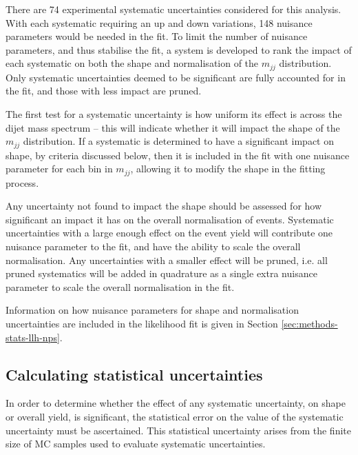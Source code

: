 
There are 74 experimental systematic uncertainties considered for this analysis.
With each systematic requiring an up and down variations, 148 nuisance
parameters would be needed in the fit. To limit the number of nuisance
parameters, and thus stabilise the fit, a system is developed to rank the impact of
each systematic on both the shape and normalisation of the $m_{jj}$
distribution. Only systematic uncertainties deemed to be significant are fully
accounted for in the fit, and those with less impact are pruned.

The first test for a systematic uncertainty is how uniform its effect is across
the dijet mass spectrum -- this will indicate whether it will impact the shape
of the $m_{jj}$ distribution. If a systematic is determined to have a
significant impact on shape, by criteria discussed below, then it is included in
the fit with one nuisance parameter for each bin in $m_{jj}$, allowing it to
modify the shape in the fitting process.

Any uncertainty not found to impact the shape should be assessed for how
significant an impact it has on the overall normalisation of events. Systematic
uncertainties with a large enough effect on the event yield will contribute one
nuisance parameter to the fit, and have the ability to scale the overall
normalisation. Any uncertainties with a smaller effect will be pruned, i.e. all
pruned systematics will be added in quadrature as a single extra nuisance
parameter to scale the overall normalisation in the fit.

Information on how nuisance parameters for shape and normalisation uncertainties
are included in the likelihood fit is given in Section
\ref{sec:methods-stats-llh-nps}.

\subsection{Calculating statistical uncertainties}

In order to determine whether the effect of any systematic uncertainty, on shape
or overall yield, is significant, the statistical error on the value of
the systematic uncertainty must be ascertained. This statistical uncertainty
arises from the finite size of \ac{MC} samples used to evaluate systematic
uncertainties.

